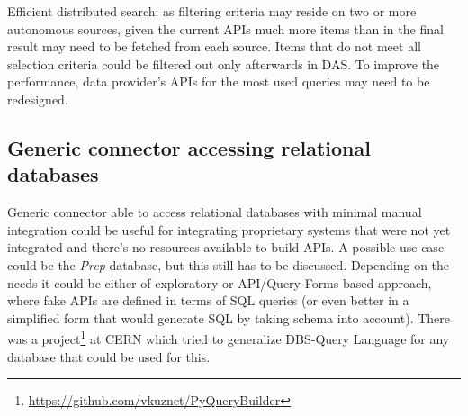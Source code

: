 \begin{compactitem}
					
					\item Efficient distributed search: as filtering criteria may reside on two or more autonomous sources, given the current APIs much more items than in the final result may need to be fetched from each source. Items that do not meet all selection criteria could be filtered out only afterwards in DAS. To improve the performance, data provider's APIs for the most used queries may need to be redesigned.
\end{compactitem}

{\color{gray}
\subsection{Generic connector accessing relational databases}
Generic connector able to access relational databases with minimal manual integration could be useful for integrating proprietary systems that were not yet integrated and there's no resources available to build APIs. A possible use-case could be the \textit{Prep} database, but this still has to be discussed. 
%
Depending on the needs it could be either of exploratory or API/Query Forms based approach, where fake APIs are defined in terms of SQL queries (or even better in a simplified form that would generate SQL by taking schema into account).
There was a project\footnote{\url{https://github.com/vkuznet/PyQueryBuilder}}   at CERN which tried to generalize DBS-Query Language for any database that could be used for this.}

